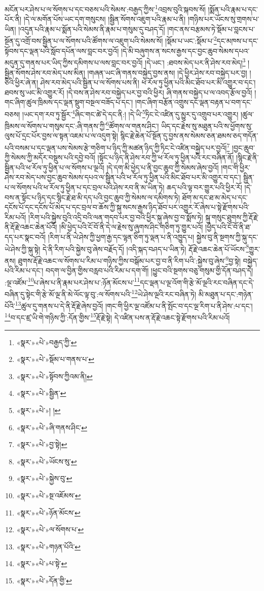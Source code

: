 མངོན་པར་ཤེས་པ་ལ་སོགས་པ་དང་བཅས་པའི་སེམས་:བརྒྱད་ཀྱིས་\footnote{«སྣར་»«པེ་»བརྒྱད་ཀྱི་}འབྲས་བུའི་སྐབས་སོ། །སྨོན་པའི་རྣམ་པ་དང་པོར་ནི། །དེ་ལ་མགོན་པོས་ཡང་དག་གསུངས། །སྦྱིན་སོགས་འཇུག་པའི་རྣམ་པ་ནི། །གཉིས་པར་ཡོངས་སུ་གྲགས་པ་ཡིན། །འདུན་པའི་རྣམ་པ་སྨོན་པའི་སེམས་ནི་རྣམ་པ་གསུམ་དུ་བཤད་དོ། །གང་ནས་བརྩམས་ཏེ་སྡོམ་པ་བླངས་པ་སྔོན་དུ་འགྲོ་བས་སྦྱིན་པ་ལ་སོགས་པའི་ཚོགས་ལ་འཇུག་པའི་སེམས་སོ། །སྡོམ་པ་ཡང་:སྡོམ་པ་\footnote{«སྣར་»«པེ་»སྡོམ་པ་གནས་པ་}དང་མཁས་པ་དང་སྟོབས་དང་ལྡན་པའི་སློབ་དཔོན་ལས་བླང་བར་བྱའོ། །དེ་མི་བཞུགས་ན་སངས་རྒྱས་དང་བྱང་ཆུབ་སེམས་དཔའ་མདུན་དུ་གནས་པར་ཡིད་ཀྱིས་དམིགས་པ་ལས་བླང་བར་བྱའོ། །དེ་ཡང་། :ཐབས་མེད་པར་ནི་ཤེས་རབ་མེད།\footnote{«སྣར་»«པེ་»སྟོབས་ཀྱིའམ་ནི།} །སྦྱིན་སོགས་ཤེས་རབ་མེད་པས་མིན། །གཞན་ཡང་ཞི་གནས་བསྐྱེད་བྱས་ནས། །དེ་ཕྱིར་ཤེས་རབ་བསྐྱེད་པར་བྱ། །ཅིའི་ཕྱིར་ཞེ་ན། ཤེས་རབ་མེད་པའི་སྦྱིན་པ་ལ་སོགས་པས་ནི། ཕ་རོལ་ཏུ་ཕྱིན་པའི་མིང་ཐོབ་པར་མི་འགྱུར་བ་དང་། ཐབས་སུ་ཡང་མི་འགྱུར་རོ། །དེ་བས་ན་ཤེས་རབ་བསྐྱེད་པར་བྱ་བའི་ཕྱིར། ཞི་གནས་བསྐྱེད་པ་ལ་འབད་རྩོལ་བྱའོ། །གང་ཞིག་ཚུལ་ཁྲིམས་དང་ལྡན་སྡུག་བསྔལ་བཟོད་པ་དང་། །གང་ཞིག་བརྩོན་འགྲུས་དང་ལྡན་བརྟན་པ་བག་དང་བཅས། །ཡང་དག་རབ་ཏུ་སྦྱོར་\footnote{«སྣར་»«པེ་»སྦྱིན་}ཞིང་གང་ཚེ་དེ་དང་ནི:། །དེ་ཡི་\footnote{«སྣར་»«པེ་»། །}ཏིང་ངེ་འཛིན་དུ་མྱུར་དུ་འགྲུབ་པར་འགྱུར། །ཚུལ་ཁྲིམས་ལ་སོགས་པ་གསུམ་དང་:ཞི་གནས་ཀྱི་\footnote{«སྣར་»«པེ་»ཞི་གནས་ཤིང་}ཚོགས་ལ་གནས་ཤིང་། ཡིད་དང་རྗེས་སུ་མཐུན་པའི་ས་ཕྱོགས་སུ་ལུས་པོ་དྲང་པོར་བྱས་ལ་སྟན་འཇམ་པ་ལ་འདུག་སྟེ། སྙིང་རྗེ་ཆེན་པོ་སྔོན་དུ་བྱས་ནས་སེམས་ཅན་ཐམས་ཅད་གདོན་པའི་བསམ་པ་དང་ལྡན་པས་སེམས་རྩེ་གཅིག་པ་ཉིད་ཀྱི་མཚན་ཉིད་ཀྱི་ཏིང་ངེ་འཛིན་བསྐྱེད་པར་བྱའོ།\footnote{«སྣར་»«པེ་»བྱ་སྟེ།} །བྱང་ཆུབ་ཀྱི་སེམས་ཀྱི་མདོར་བསྡུས་པའི་དབྱེ་བའོ། །སྟོང་པ་ཉིད་ནི་ཤེས་རབ་ཀྱི་ཕ་རོལ་ཏུ་ཕྱིན་པའི་རང་བཞིན་ནོ། །སྙིང་རྗེ་ནི་སྦྱིན་པའི་ཕ་རོལ་ཏུ་ཕྱིན་པ་ལ་སོགས་པ་ལྔའོ། །དེ་དག་མི་ཕྱེད་པ་ནི་བྱང་ཆུབ་ཀྱི་སེམས་ཞེས་བྱའོ། །གང་གི་ཕྱིར་ཤེས་རབ་མེད་པས་བྱང་ཆུབ་སེམས་དཔའ་ལ་སྦྱིན་པའི་ཕ་རོལ་ཏུ་ཕྱིན་པའི་མིང་ཐོབ་པར་མི་འགྱུར་བ་དང་། སྦྱིན་པ་ལ་སོགས་པའི་ཕ་རོལ་ཏུ་ཕྱིན་པ་དང་བྲལ་པའི་ཤེས་རབ་ནི་མ་ཡིན་ཏེ། ཆད་པའི་ལྟ་བར་གྱུར་པའི་ཕྱིར་རོ། །དེ་བས་ན་སྟོང་པ་ཉིད་དང་སྙིང་རྗེ་ཐ་མི་དད་པའི་བྱང་ཆུབ་ཀྱི་སེམས་ལ་དམིགས་ཏེ། ཐོག་མ་དང་ཐ་མ་མེད་པ་དང་དངོས་པོ་དང་དངོས་པོ་མེད་པ་དང་བྲལ་བ་ཆོས་ཀྱི་སྐུ་སངས་རྒྱས་ཉིད་ཐོབ་པར་འགྱུར་རོ་ཞེས་པ་སྟེ་རྫོགས་པའི་རིམ་པའོ། །རིག་པའི་སྐྱེས་བུའི་འདྲི་བའི་ལན་གདབ་པར་བྱ་བའི་ཕྱིར་སྐུ་ཞེས་བྱ་བ་སྨོས་ཏེ། སྐུ་གསུང་ཐུགས་ཀྱི་རྡོ་རྗེ་ནི་རྡོ་རྗེ་འཆང་ཆེན་པོའོ། །མི་ཕྱེད་པའི་ངོ་བོ་ནི་དེ་ལ་རྗེས་སུ་ཞུགས་ཤིང་གཅིག་ཏུ་གྱུར་པའོ། །ཕྱེད་པའི་ངོ་བོ་ནི་ཐ་དད་པར་སྣང་བའོ། །རིག་པ་ནི་ཡེ་ཤེས་ཀྱི་ཕྱག་རྒྱ་དང་ལྷན་ཅིག་ཏུ་ལྡན་པ་ནི་འཁྱུད་པ། སྐྱེས་བུ་ནི་སྔགས་ཀྱི་སྐུ་དང་ཡེ་ཤེས་ཀྱི་སྐུ་སྟེ། དེ་ནི་རིག་པའི་སྐྱེས་བུ་ཞེས་བརྗོད་དོ། །འདི་སྐད་བཤད་པ་ཡིན་ཏེ། རྡོ་རྗེ་འཆང་ཆེན་པོ་ཡོངས་\footnote{«སྣར་»«པེ་»ཡོངས་སུ་}གྱུར་ནས། ཐུགས་རྡོ་རྗེ་འཆང་ལ་སོགས་པ་རིམ་པ་གཉིས་ཀྱིས་བསྒོམ་པར་བྱ་བ་ནི་རིག་པའི་:སྐྱེས་བུ་ཞེས་\footnote{«སྣར་»«པེ་»སྐྱེས་བུ་}བྱ་སྟེ། བསྐྱེད་པའི་རིམ་པ་དང་། བདག་ལ་བྱིན་གྱིས་བརླབ་པའི་རིམ་པ་དག་གོ། །ཕྱུང་བའི་སྔགས་བཅུ་གསུམ་གྱི་དོན་བཤད་དེ། :ལྔ་འཛོམ་\footnote{«སྣར་»«པེ་»སྔ་འཇོམས་}པ་ཞེས་པ་ནི་རྣམ་པར་ཤེས་པ་:ཉོན་མོངས་པ་\footnote{«སྣར་»«པེ་»ཉོན་མོངས་}དང་ལྡན་པ་ལྔ་འོག་གི་རྩེ་མོ་ལྔའི་རང་བཞིན་དང་དེ་བཞིན་དུ་སྟེང་གི་རྩེ་མོ་ལྔ་ནི་མེ་ལོང་ལྟ་བུ་:ལ་སོགས་པའི་\footnote{«སྣར་»«པེ་»ལ་སོགས་པ་}ཡེ་ཤེས་ལྔའི་རང་བཞིན་ཏེ། མི་མཐུན་པ་དང་:གཉེན་པོའི་\footnote{«སྣར་»«པེ་»གཉན་པོའི་}ཚུལ་དུ་གནས་པ་དེ་ནི་རྡོ་རྗེ་ཞེས་བྱའོ། །གང་གི་ཕྱིར་ལྔ་འཛོམ་པ་ནི་སྤོང་བ་དང་ལྔ་རིག་པ་ནི་ཤེས་:པ་དང་། \footnote{«སྣར་»«པེ་»པ་སྟེ་}བ་དང་ཛྲ་ཡི་གེ་གཉིས་ཀྱི་:དོན་གྱིས་\footnote{«སྣར་»«པེ་»དོན་གྱི་}རྡོ་རྗེ་སྟེ། དེ་འཛིན་པས་ན་རྡོ་རྗེ་འཆང་སྟེ་རྫོགས་པའི་རིམ་པའོ། 